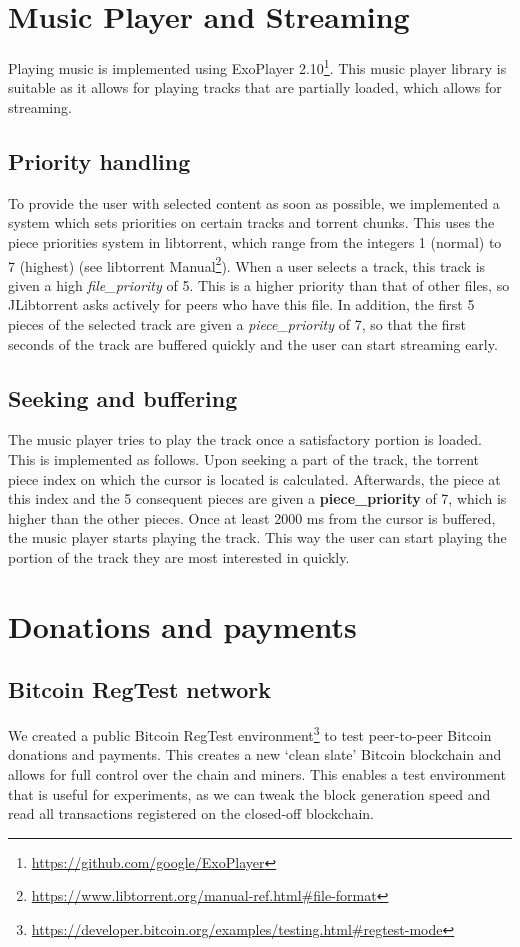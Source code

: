 \section{Music Player and Streaming}
Playing music is implemented using ExoPlayer 2.10\footnote{\url{https://github.com/google/ExoPlayer}}. This music player library is suitable as it allows for playing tracks that are partially loaded, which allows for streaming.
\subsection{Priority handling}
To provide the user with selected content as soon as possible, we implemented a system which sets priorities on certain tracks and torrent chunks. This uses the piece priorities system in libtorrent, which range from the integers 1 (normal) to 7 (highest) (see libtorrent Manual\footnote{\url{https://www.libtorrent.org/manual-ref.html\#file-format}}). When a user selects a track, this track is given a high \textit{file\_priority} of 5. This is a higher priority than that of other files, so JLibtorrent asks actively for peers who have this file. In addition, the first 5  pieces of the selected track are given a \textit{piece\_priority} of 7, so that the first seconds of the track are buffered quickly and the user can start streaming early.
\subsection{Seeking and buffering}
The music player tries to play the track once a satisfactory portion is loaded. This is implemented as follows. Upon seeking a part of the track, the torrent piece index on which the cursor is located is calculated. Afterwards, the piece at this index and the 5 consequent pieces are given a \textbf{piece\_priority} of 7, which is higher than the other pieces. Once at least 2000 ms from the cursor is buffered, the music player starts playing the track. This way the user can start playing the portion of the track they are most interested in quickly.
\section{Donations and payments}
\subsection{Bitcoin RegTest network}
We created a public Bitcoin RegTest environment\footnote{\url{https://developer.bitcoin.org/examples/testing.html\#regtest-mode}} to test peer-to-peer Bitcoin donations and payments. This creates a new `clean slate' Bitcoin blockchain and allows for full control over the chain and miners. This enables a test environment that is useful for experiments, as we can tweak the block generation speed and read all transactions registered on the closed-off blockchain.
\label{sec:regtest-network-impl}
